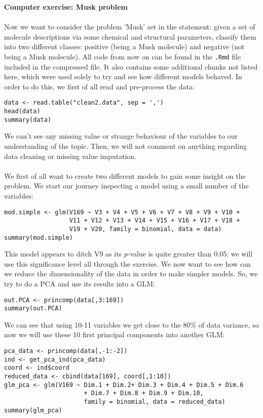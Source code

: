 \documentclass[10pt]{article}
\begin{document}
\newpage
\Huge{\textbf{Computer exercise: Musk problem}} \\ \ \\
\Large
Now we want to consider the problem 'Musk' set in the statement: given a set of molecule descriptions via some chemical and structural parameters, classify them into two different classes: positive (being a Musk molecule) and negative (not being a Musk molecule). All code from now on can be found in the \verb|.Rmd| file included in the compressed file. It also contains some additional chunks not listed here, which were used solely to try and see how different models behaved. In order to do this, we first of all read and pre-process the data:
\begin{verbatim}
data <- read.table("clean2.data", sep = ',')
head(data)
summary(data)
\end{verbatim}
We can't see any missing value or strange behaviour of the variables to our understanding of the topic. Then, we will not comment on anything regarding data cleaning or missing value imputation.
\\ \ \\
We first of all want to create two different models to gain some insight on the problem. We start our journey inspecting a model using a small number of the variables:
\begin{verbatim}
mod.simple <- glm(V169 ~ V3 + V4 + V5 + V6 + V7 + V8 + V9 + V10 +
                  V11 + V12 + V13 + V14 + V15 + V16 + V17 + V18 +
                  V19 + V20, family = binomial, data = data)
summary(mod.simple)
\end{verbatim}
This model appears to ditch V9 as its $p$-value is quite greater than 0.05: we will use this significance level all through the exercise. We now want to see how can we reduce the dimensionality of the data in order to make simpler models. So, we try to do a PCA and use its results into a GLM:
\begin{verbatim}
out.PCA <- princomp(data[,3:169])
summary(out.PCA)
\end{verbatim}
\newpage
We can see that using 10-11 variables we get close to the 80\% of data variance, so now we will use these 10 first principal components into another GLM:
\begin{verbatim}
pca_data <- princomp(data[,-1:-2])
ind <- get_pca_ind(pca_data)
coord <- ind$coord
reduced_data <- cbind(data[169], coord[,1:10])
glm_pca <- glm(V169 ~ Dim.1 + Dim.2+ Dim.3 + Dim.4 + Dim.5 + Dim.6
                      + Dim.7 + Dim.8 + Dim.9 + Dim.10,
                      family = binomial, data = reduced_data)
summary(glm_pca)
\end{verbatim}
\end{document}
